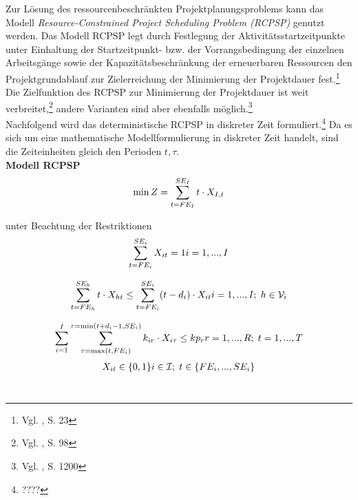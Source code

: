 \documentclass[a4paper,12pt,parskip,bibtotoc,liststotoc]{article}
\begin{document}
Zur Lösung des ressourcenbeschränkten Projektplanungsproblems kann das Modell \textit{Resource-Constrained Project Scheduling Problem (RCPSP)} genutzt werden. Das Modell RCPSP legt durch Festlegung der Aktivitätsstartzeitpunkte unter Einhaltung der Startzeitpunkt- bzw. der Vorrangsbedingung der einzelnen Arbeitsgänge sowie der Kapazitätsbeschränkung der erneuerbaren Ressourcen den Projektgrundablauf zur Zielerreichung der Minimierung der Projektdauer fest.\footnote{Vgl. \cite{demeulemeester2011robust}, S. 23} Die Zielfunktion des RCPSP zur Minimierung der Projektdauer ist weit verbreitet,\footnote{Vgl. \cite{drexl1997neuere}, S. 98} andere Varianten sind aber ebenfalls möglich.\footnote{Vgl. \cite{talbot1982resource}, S. 1200}\\

Nachfolgend wird das deterministische RCPSP in diskreter Zeit formuliert.\footnote{????} Da es sich um eine mathematische Modellformulierung in diskreter Zeit handelt, sind die Zeiteinheiten gleich den Perioden $t, \tau$.\\
\textbf{Modell RCPSP}
\begin{eqnarray} \label{Ziel}
\min Z = \sum_{t=FE_{I}}^{SE_{I}}t \cdot X_{I,t}\hfill  
\end{eqnarray}

unter Beachtung der Restriktionen
\begin{multline} \label{N1}
\sum_{t=FE_{i}}^{SE_{i}} X_{it} = 1
\hfill   i = 1,...,I
\end{multline}\vspace{-3.0ex}

\begin{multline} \label{N2}
\sum_{t=FE_{h}}^{SE_{h}}t \cdot X_{ht} \leq \sum_{t=FE_{i}}^{SE_{i}}(t - d_{i}) \cdot X_{it}
\hfill   i =1,...,I;\; h \in \mathcal{V}_{i}
\end{multline}\vspace{-3.0ex}

\begin{multline} \label{N3}
\sum_{i=1}^{I}\sum_{\tau=\max(t,FE_{i})}^{\tau=\min(t+d_i-1,SE_i)}k_ {ir} \cdot X_{i\tau} \leq kp_{r}
\hfill   r =1,...,R;\; t=1,...,T
\end{multline}\vspace{-3.0ex}
\begin{multline} \label{N4}
X_{it} \in \{0,1\}
\hfill   i \in \mathcal{I};\; t \in \{FE_{i},...,SE_{i}\}\end{multline}\vspace{-6.0ex}\\
\end{document}
